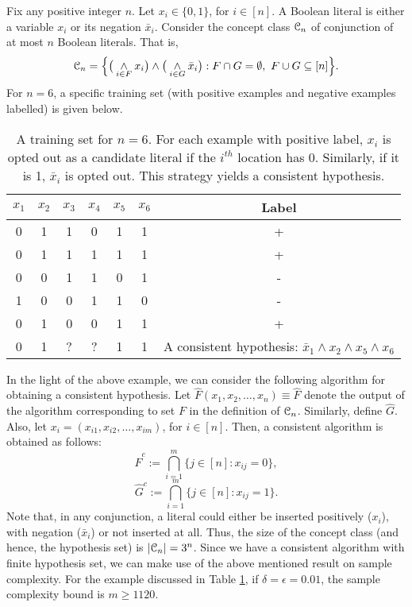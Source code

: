 \documentclass[a4paper,english,12pt]{article}
\begin{document}
\begin{exmp}
Fix  any positive integer $n$. Let $x_i\in\{0,1\}$, for $i\in[n]$. A Boolean literal is either a variable $x_i$ or its negation $\bar{x}_i$. Consider the concept class $\mathcal{C}_n$ of conjunction of at most $n$ Boolean literals. That is, $$\mathcal{C}_n=\Big\{\big(\underset{i\in F}\wedge x_i\big)\wedge \big(\underset{i\in G}\wedge \bar{x}_i\big):F\cap G=\emptyset,~F\cup G \subseteq [n]\Big\}.$$ For $n=6$, a specific training set (with positive examples and negative examples labelled) is given below. 
\begin{center}
\begin{table}[h!]
\centering
\begin{tabular}{ |c|c|c|c|c|c|c| } 
 \hline
 $x_1$ & $x_2$ & $x_3$ & $x_4$ & $x_5$ & $x_6$ & Label \\
 \hline
 \hline
 0 & 1 & 1 & 0 & 1 & 1 & + \\ 
  \hline 
 0 & 1 & 1 & 1 & 1 & 1 & +\\ 
  \hline 
 0 & 0 & 1 & 1 & 0 & 1 & -\\ 
  \hline 
 1 & 0 & 0 & 1 & 1 & 0 & -\\ 
  \hline 
 0 & 1 & 0 & 0 & 1 & 1 & +\\
 \hline
 \hline
  0 & 1 & ? & ? & 1 & 1 & A consistent hypothesis: $\bar{x}_1\wedge x_2\wedge x_5 \wedge x_6$ \\ 
 \hline
\end{tabular}
\caption{A training set for $n=6$. For each example with positive label, $x_i$ is opted out as a candidate literal  if the $i^{th}$ location has 0. Similarly, if it is 1, $\bar{x}_i$ is opted out. This strategy yields a consistent hypothesis.}
\label{Table_Boolean_Lit}
\end{table}
\end{center}
In the light of the above example, we can consider the following algorithm for obtaining a consistent hypothesis. Let $ \hat{F}(x_1,x_2,\hdots,x_n)\equiv \hat{F}$ denote the output of the algorithm corresponding to set $F$ in the definition of $\mathcal{C}_n$. Similarly, define $\hat{G}$. Also, let $x_i=(x_{i1},x_{i2},\hdots,x_{im})$, for $i\in[n]$. Then, a consistent algorithm is obtained as follows: $$\hat{F}^c:=\bigcap_{i=1}^{m}\big\{j\in[n]: x_{ij}=0\big\},$$ $$\hat{G}^c:=\bigcap_{i=1}^{m}\big\{j\in[n]: x_{ij}=1\big\}.$$
 Note that, in any conjunction, a literal could either be inserted positively ($x_i$), with negation ($\bar{x}_i$) or not inserted at all. Thus, the size of the concept class (and hence,  the hypothesis set) is $|\mathcal{C}_n|=3^n$. Since we have a consistent algorithm with finite hypothesis set, we can make use of the above mentioned result on sample complexity. For the example discussed in Table \ref{Table_Boolean_Lit}, if $\delta=\epsilon=0.01$, the sample complexity bound is $m\geq 1120$.
\end{exmp}
\end{document}
